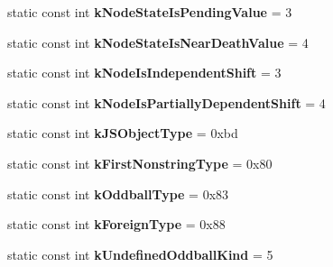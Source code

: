 \begin{DoxyCompactItemize}
\item 
\hypertarget{classv8_1_1internal_1_1_internals_a843b53b17257ecd957eade0d9f21c5ab}{}static const int {\bfseries k\+Node\+State\+Is\+Pending\+Value} = 3\label{classv8_1_1internal_1_1_internals_a843b53b17257ecd957eade0d9f21c5ab}

\item 
\hypertarget{classv8_1_1internal_1_1_internals_a18f3e757639b07bdabb8cda7dd4a8bdb}{}static const int {\bfseries k\+Node\+State\+Is\+Near\+Death\+Value} = 4\label{classv8_1_1internal_1_1_internals_a18f3e757639b07bdabb8cda7dd4a8bdb}

\item 
\hypertarget{classv8_1_1internal_1_1_internals_a228b2b58c77c17bc512b92d9e3aea48b}{}static const int {\bfseries k\+Node\+Is\+Independent\+Shift} = 3\label{classv8_1_1internal_1_1_internals_a228b2b58c77c17bc512b92d9e3aea48b}

\item 
\hypertarget{classv8_1_1internal_1_1_internals_aeda4d6fc1bd10ca57398597f3bb496f3}{}static const int {\bfseries k\+Node\+Is\+Partially\+Dependent\+Shift} = 4\label{classv8_1_1internal_1_1_internals_aeda4d6fc1bd10ca57398597f3bb496f3}

\item 
\hypertarget{classv8_1_1internal_1_1_internals_a56b7062df5d9a7df491137d4c3341bcc}{}static const int {\bfseries k\+J\+S\+Object\+Type} = 0xbd\label{classv8_1_1internal_1_1_internals_a56b7062df5d9a7df491137d4c3341bcc}

\item 
\hypertarget{classv8_1_1internal_1_1_internals_a6f4a54927b01a11f444fb2f00b47ca1d}{}static const int {\bfseries k\+First\+Nonstring\+Type} = 0x80\label{classv8_1_1internal_1_1_internals_a6f4a54927b01a11f444fb2f00b47ca1d}

\item 
\hypertarget{classv8_1_1internal_1_1_internals_a13081e936f8c96472f1b1496c70d4dc1}{}static const int {\bfseries k\+Oddball\+Type} = 0x83\label{classv8_1_1internal_1_1_internals_a13081e936f8c96472f1b1496c70d4dc1}

\item 
\hypertarget{classv8_1_1internal_1_1_internals_a263195f36f9e8ee64af70dc267a85d55}{}static const int {\bfseries k\+Foreign\+Type} = 0x88\label{classv8_1_1internal_1_1_internals_a263195f36f9e8ee64af70dc267a85d55}

\item 
\hypertarget{classv8_1_1internal_1_1_internals_a39072b9e0ffea4031f4a1c514208b20d}{}static const int {\bfseries k\+Undefined\+Oddball\+Kind} = 5\label{classv8_1_1internal_1_1_internals_a39072b9e0ffea4031f4a1c514208b20d}


\end{DoxyCompactItemize}

